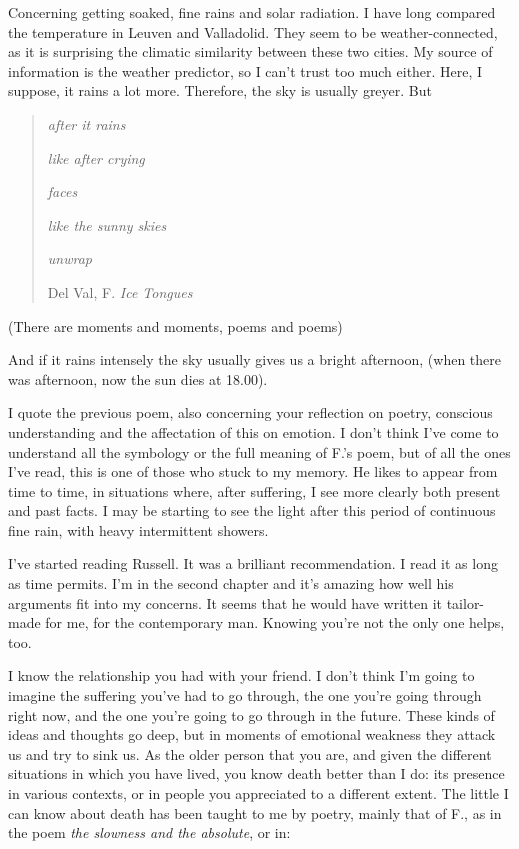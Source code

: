 \documentclass[]{book}
\begin{document}
Concerning getting soaked, fine rains and solar radiation. I have long compared the temperature in Leuven and Valladolid. They seem to be weather-connected, as it is surprising the climatic similarity between these two cities. My source of information is the weather predictor, so I can't trust too much either. Here, I suppose, it rains a lot more. Therefore, the sky is usually greyer. But

\begin{quote}
\emph{after it rains}

\emph{like after crying}

\emph{faces}

\emph{like the sunny skies}

\emph{unwrap}

Del Val, F. \emph{Ice Tongues} \citep{val2012hielo}
\end{quote}

(There are moments and moments, poems and poems)

And if it rains intensely the sky usually gives us a bright afternoon, (when there was afternoon, now the sun dies at 18.00).

I quote the previous poem, also concerning your reflection on poetry, conscious understanding and the affectation of this on emotion. I don't think I've come to understand all the symbology or the full meaning of F.'s poem, but of all the ones I've read, this is one of those who stuck to my memory. He likes to appear from time to time, in situations where, after suffering, I see more clearly both present and past facts. I may be starting to see the light after this period of continuous fine rain, with heavy intermittent showers.

I've started reading Russell. It was a brilliant recommendation. I read it as long as time permits. I'm in the second chapter and it's amazing how well his arguments fit into my concerns. It seems that he would have written it tailor-made for me, for the contemporary man. Knowing you're not the only one helps, too.

I know the relationship you had with your friend. I don't think I'm going to imagine the suffering you've had to go through, the one you're going through right now, and the one you're going to go through in the future. These kinds of ideas and thoughts go deep, but in moments of emotional weakness they attack us and try to sink us. As the older person that you are, and given the different situations in which you have lived, you know death better than I do: its presence in various contexts, or in people you appreciated to a different extent. The little I can know about death has been taught to me by poetry, mainly that of F., as in the poem \emph{the slowness and the absolute}, or in:
\end{document}
